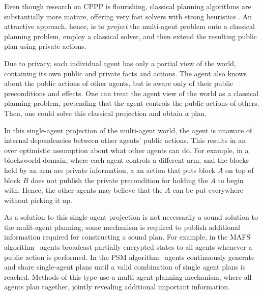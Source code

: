 \documentclass[letterpaper]{article}
\theoremstyle{definition}
\begin{document}
Even though research on CPPP is flourishing, classical planning algorithms are substantially more mature, offering very fast solvers with strong heuristics \cite{hoffmann2001ff,helmert2009landmarks}. An attractive approach, hence, is to {\em project} the multi-agent problem onto a classical planning problem,  employ a classical solver, and then extend the resulting public plan using private actions. 

Due to privacy, each individual agent has only a partial view of the world, containing its own public and private facts and actions. The agent also knows about the public actions of other agents, but is aware only of their public preconditions and effects. One can treat the agent view of the world as a classical planning problem, pretending that the agent controls the public actions of others. Then, one could solve this classical projection and obtain a plan.

In this single-agent projection of the multi-agent world, the agent is unaware of internal dependencies between other agents' public actions. This results in an over optimistic assumption about what other agents can do. For example, in a blocksworld domain, where each agent controls a different arm, and the blocks held by an arm are private information, a an action that puts block $A$ on top of block $B$ does not publish the private precondition for holding the $A$ to begin with. Hence, the other agents may believe that the $A$ can be put everywhere without picking it up.


As a solution to this single-agent projection is not necessarily a sound solution to the mulit-agent planning, some mechanism is required to publish additional information required for constructing a sound plan. For example, in the MAFS algorithm~\cite{nissim2014distributed} agents broadcast partially encrypted states to all agents whenever a public action is performed. In the PSM algorithm~\cite{tovzivcka2014generating} agents continuously generate and share single-agent plans until a valid combination of single agent plans is reached. Methods of this type use a  multi agent planning mechanism, where all agents plan together, jointly revealing additional important information.
\end{document}
